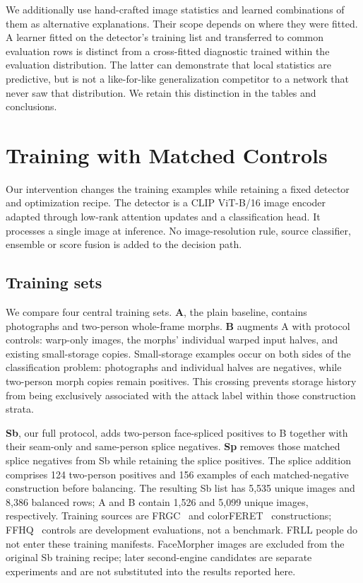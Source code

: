 We additionally use hand-crafted image statistics and learned combinations of them as alternative explanations. Their scope depends on where they were fitted. A learner fitted on the detector's training list and transferred to common evaluation rows is distinct from a cross-fitted diagnostic trained within the evaluation distribution. The latter can demonstrate that local statistics are predictive, but is not a like-for-like generalization competitor to a network that never saw that distribution. We retain this distinction in the tables and conclusions.

\section{Training with Matched Controls}
\label{sec:training}

Our intervention changes the training examples while retaining a fixed detector and optimization recipe. The detector is a CLIP ViT-B/16 image encoder adapted through low-rank attention updates and a classification head. It processes a single image at inference. No image-resolution rule, source classifier, ensemble or score fusion is added to the decision path.

\subsection{Training sets}
We compare four central training sets. \textbf{A}, the plain baseline, contains photographs and two-person whole-frame morphs. \textbf{B} augments A with protocol controls: warp-only images, the morphs' individual warped input halves, and existing small-storage copies. Small-storage examples occur on both sides of the classification problem: photographs and individual halves are negatives, while two-person morph copies remain positives. This crossing prevents storage history from being exclusively associated with the attack label within those construction strata.

\textbf{Sb}, our full protocol, adds two-person face-spliced positives to B together with their seam-only and same-person splice negatives. \textbf{Sp} removes those matched splice negatives from Sb while retaining the splice positives. The splice addition comprises 124 two-person positives and 156 examples of each matched-negative construction before balancing. The resulting Sb list has 5,535 unique images and 8,386 balanced rows; A and B contain 1,526 and 5,099 unique images, respectively. Training sources are FRGC~\cite{phillips2005frgc} and colorFERET~\cite{nistColorFeret} constructions; FFHQ~\cite{karras2019stylegan} controls are development evaluations, not a benchmark. FRLL people do not enter these training manifests. FaceMorpher images are excluded from the original Sb training recipe; later second-engine candidates are separate experiments and are not substituted into the results reported here.

